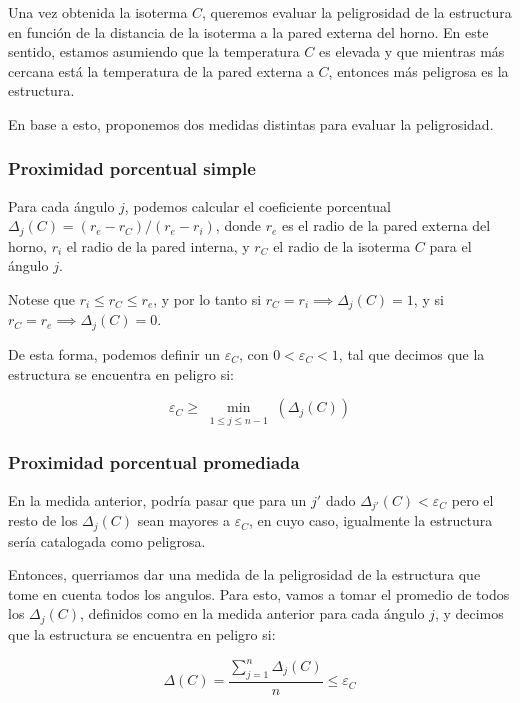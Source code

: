 Una vez obtenida la isoterma $C$, queremos evaluar la peligrosidad de la estructura en función de la distancia de la isoterma a la pared externa del horno. En este sentido, estamos asumiendo que la temperatura $C$ es elevada y que mientras más cercana está la temperatura de la pared externa a $C$, entonces más peligrosa es la estructura.

En base a esto, proponemos dos medidas distintas para evaluar la peligrosidad.

\subsubsection{Proximidad porcentual simple}

Para cada ángulo $j$, podemos calcular el coeficiente porcentual $\Delta_j(C) = (r_e - r_C)/(r_e - r_i)$, donde $r_e$ es el radio de la pared externa del horno, $r_i$ el radio de la pared interna, y $r_C$ el radio de la isoterma $C$ para el ángulo $j$.

Notese que $r_i \leq r_C \leq r_e$, y por lo tanto si $r_C = r_i \implies \Delta_j(C) = 1$, y si $r_C = r_e \implies \Delta_j(C) = 0$.

De esta forma, podemos definir un $\varepsilon_C$, con $0 < \varepsilon_C < 1 $, tal que decimos que la estructura se encuentra en peligro si:

$$\varepsilon_C \geq \min\limits_{\substack{1 \leq j \leq n-1}}(\Delta_j(C))$$

\subsubsection{Proximidad porcentual promediada}

En la medida anterior, podría pasar que para un $j'$ dado $\Delta_{j'}(C) < \varepsilon_C$ pero el resto de los $\Delta_j(C)$ sean mayores a $\varepsilon_C$, en cuyo caso, igualmente la estructura sería catalogada como peligrosa.

Entonces, querriamos dar una medida de la peligrosidad de la estructura que tome en cuenta todos los angulos. Para esto, vamos a tomar el promedio de todos los $\Delta_j(C)$, definidos como en la medida anterior para cada ángulo $j$, y decimos que la estructura se encuentra en peligro si:

$$\Delta(C)= \frac{\sum\limits_{j=1}^{n}{\Delta_j(C)}}{n} \leq  \varepsilon_C$$
